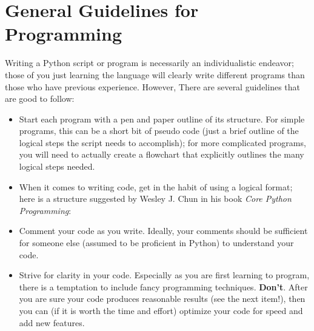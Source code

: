 \section{General Guidelines for Programming}
\label{sec-programmingGuidelines}
Writing a Python script or program is necessarily an individualistic endeavor; those of you just learning the language will clearly write different programs than those who have previous experience. However, There are several guidelines that are good to follow: 
\begin{itemize}
	\item Start each program with a pen and paper outline of its structure. For simple programs, this can be a short bit of pseudo code (just a brief outline of the logical steps the script needs to accomplish); for more complicated programs, you will need to actually create a flowchart that explicitly outlines the many logical steps needed. 
	\item When it comes to writing code, get in the habit of using a logical format; here is a structure suggested by Wesley J. Chun in his book \textit{Core Python Programming}\cite{chun2007}:
	
	\item Comment your code as you write. Ideally, your comments should be sufficient for someone else (assumed to be proficient in Python) to understand your code. 
	
	\item Strive for clarity in your code. Especially as you are first learning to program, there is a temptation to include fancy programming techniques. \textbf{Don't}. After you are sure your code produces reasonable results (see the next item!), then you can (if it is worth the time and effort) optimize your code for speed and add new features. 
	

\end{itemize}

